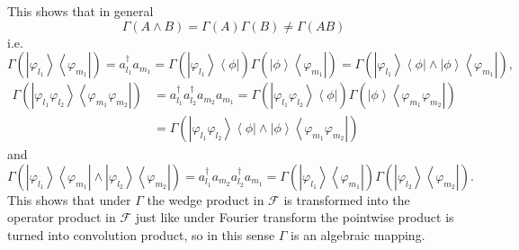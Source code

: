 \documentclass[aps,preprint]{revtex4}%
\begin{document}
This shows that in general
\begin{equation}
\Gamma(A\wedge B)=\Gamma(A)\Gamma(B)\neq\Gamma(AB)
\end{equation}
i.e.
\begin{equation}
\Gamma\left(  \left\vert \varphi_{l_{1}}\right\rangle \left\langle
\varphi_{m_{1}}\right\vert \right)  =a_{l_{1}}^{\dagger}a_{m_{1}}%
=\Gamma\left(  \left\vert \varphi_{l_{1}}\right\rangle \left\langle
\phi\right\vert \right)  \Gamma\left(  \left\vert \phi\right\rangle
\left\langle \varphi_{m_{1}}\right\vert \right)  =\Gamma\left(  \left\vert
\varphi_{l_{1}}\right\rangle \left\langle \phi\right\vert \wedge\left\vert
\phi\right\rangle \left\langle \varphi_{m_{1}}\right\vert \right)  ,
\end{equation}%
\begin{align}
\Gamma\left(  \left\vert \varphi_{l_{1}}\varphi_{l_{2}}\right\rangle
\left\langle \varphi_{m_{1}}\varphi_{m_{2}}\right\vert \right)   &  =a_{l_{1}%
}^{\dagger}a_{l_{2}}^{\dagger}a_{m_{2}}a_{m_{1}}=\Gamma\left(  \left\vert
\varphi_{l_{1}}\varphi_{l_{2}}\right\rangle \left\langle \phi\right\vert
\right)  \Gamma\left(  \left\vert \phi\right\rangle \left\langle
\varphi_{m_{1}}\varphi_{m_{2}}\right\vert \right) \nonumber\\
&  =\Gamma\left(  \left\vert \varphi_{l_{1}}\varphi_{l_{2}}\right\rangle
\left\langle \phi\right\vert \wedge\left\vert \phi\right\rangle \left\langle
\varphi_{m_{1}}\varphi_{m_{2}}\right\vert \right)
\end{align}
and
\begin{equation}
\Gamma\left(  \left\vert \varphi_{l_{1}}\right\rangle \left\langle
\varphi_{m_{1}}\right\vert \wedge\left\vert \varphi_{l_{2}}\right\rangle
\left\langle \varphi_{m_{2}}\right\vert \right)  =a_{l_{1}}^{\dagger}a_{m_{2}%
}a_{l_{2}}^{\dagger}a_{m_{1}}=\Gamma\left(  \left\vert \varphi_{l_{1}%
}\right\rangle \left\langle \varphi_{m_{1}}\right\vert \right)  \Gamma\left(
\left\vert \varphi_{l_{2}}\right\rangle \left\langle \varphi_{m_{2}%
}\right\vert \right)  .
\end{equation}
This shows that under $\Gamma$ the wedge product in $\mathcal{F}$ is
transformed into the operator product in $\mathcal{F}$ just like under Fourier
transform the pointwise product is turned into convolution product, so in this
sense $\Gamma$ is an algebraic mapping.
\end{document}
